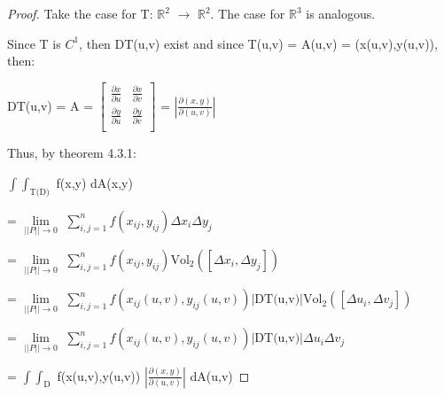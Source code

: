     \begin{proof}
        Take the case for T: $\mathbb{R}^2$ $\rightarrow$ $\mathbb{R}^2$.
        The case for $\mathbb{R}^3$ is analogous.

        Since T is $C^1$, then DT(u,v) exist and since
        T(u,v) = A(u,v) = (x(u,v),y(u,v)), then:

        \hspace{0.5cm}
        DT(u,v) = A =
        $
        \begin{bmatrix}
            \frac{\partial x}{\partial u} & \frac{\partial x}{\partial v} \\
            \frac{\partial y}{\partial u} & \frac{\partial y}{\partial v} \\
        \end{bmatrix}
        $
        = $|\frac{\partial(x,y)}{\partial(u,v)}|$

        Thus, by {\color{red} theorem 4.3.1}:

        \hspace{0.5cm}
        $\int \int_\text{T(D)}$ f(x,y) dA(x,y)

        \hspace{0.5cm}
        = $\underset{||P|| \rightarrow 0}{\lim}$
            $\sum_{i,j=1}^n f(x_{ij},y_{ij}) \Delta x_i \Delta y_j$

        \hspace{0.5cm}
        = $\underset{||P|| \rightarrow 0}{\lim}$
            $\sum_{i,j=1}^n f(x_{ij},y_{ij})
            \text{Vol}_2([\Delta x_i , \Delta y_j])$

        \hspace{0.5cm}
        = $\underset{||P|| \rightarrow 0}{\lim}$
            $\sum_{i,j=1}^n f(x_{ij}(u,v),y_{ij}(u,v))
            |\text{DT(u,v)}| \text{Vol}_2([\Delta u_i , \Delta v_j])$

        \hspace{0.5cm}
        = $\underset{||P|| \rightarrow 0}{\lim}$
            $\sum_{i,j=1}^n f(x_{ij}(u,v),y_{ij}(u,v))
            |\text{DT(u,v)}| \Delta u_i \Delta v_j$

        \hspace{0.5cm}
        = $\int \int_\text{D}$ f(x(u,v),y(u,v))
            $|\frac{\partial(x,y)}{\partial(u,v)}|$ dA(u,v)
    \end{proof}




